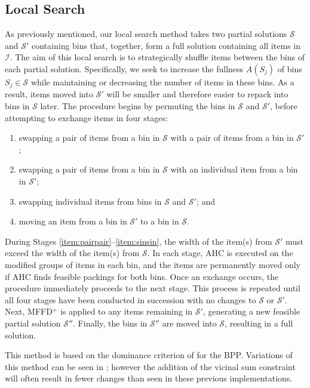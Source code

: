\documentclass[authoryear]{elsarticle}
\begin{document}
\subsection{Local Search}
\label{sub:localsearch}
\noindent As previously mentioned, our local search method takes two partial solutions $\mathcal{S}$ and $\mathcal{S}'$ containing bins that, together, form a full solution containing all items in $\mathcal{I}$. The aim of this local search is to strategically shuffle items between the bins of each partial solution. Specifically, we seek to increase the fullness $A(S_j)$ of bins $S_j \in \mathcal{S}$ while maintaining or decreasing the number of items in these bins. As a result, items moved into $\mathcal{S}'$ will be smaller and therefore easier to repack into bins in $\mathcal{S}$ later. The procedure begins by permuting the bins in $\mathcal{S}$ and $\mathcal{S}'$, before attempting to exchange items in four stages:
\begin{enumerate}[label={(\arabic*)},itemsep=-2pt,topsep=2pt]
	\item swapping a pair of items from a bin in $\mathcal{S}$ with a pair of items from a bin in $\mathcal{S}'$;\label{item:pairpair}
	\item swapping a pair of items from a bin in $\mathcal{S}$ with an individual item from a bin in $\mathcal{S}'$;\label{item:pairsin}
	\item swapping individual items from bins in $\mathcal{S}$ and $\mathcal{S}'$;\label{item:sinsin} and
	\item moving an item from a bin in $\mathcal{S}'$ to a bin in $\mathcal{S}$.\label{item:movesin}
\end{enumerate} 
During Stages \ref{item:pairpair}--\ref{item:sinsin}, the width of the item(s) from $\mathcal{S}'$ must exceed the width of the item(s) from $\mathcal{S}$. In each stage, AHC is executed on the modified groups of items in each bin, and the items are permanently moved only if AHC finds feasible packings for both bins. Once an exchange occurs, the procedure immediately proceeds to the next stage. This process is repeated until all four stages have been conducted in succession with no changes to $\mathcal{S}$ or $\mathcal{S}'$. Next, MFFD$^+$ is applied to any items remaining in $\mathcal{S}'$, generating a new feasible partial solution $\mathcal{S}''$. Finally, the bins in $\mathcal{S}''$ are moved into $\mathcal{S}$, resulting in a full solution.

This method is based on the dominance criterion of \citet{martello1990l} for the BPP. Variations of this method can be seen in \citet{lewis2009, lewis2017, falkenauer1996, levine2004}; however the addition of the vicinal sum constraint will often result in fewer changes than seen in these previous implementations.
\end{document}
